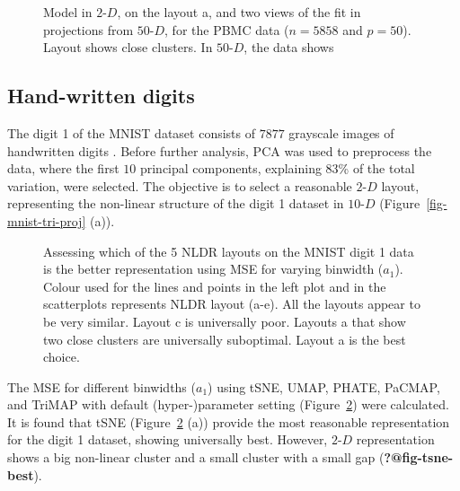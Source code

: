 \documentclass[
  12pt]{article}
\newcommand\gD{$2\text{-}D$}
\begin{document}
\begin{figure}[H]


\caption{\label{fig-model-pbmc-author-proj-scdeed}Model in \gD{}, on the
layout a, and two views of the fit in projections from \(50\text{-}D\),
for the PBMC data (\(n =  5858\) and \(p = 50\)). Layout shows close
clusters. In \(50\text{-}D\), the data shows}

\end{figure}%

\subsection{Hand-written digits}\label{hand-written-digits}

The digit 1 of the MNIST dataset consists of \(7877\) grayscale images
of handwritten digits \citep{lecun2010}. Before further analysis, PCA
was used to preprocess the data, where the first \(10\) principal
components, explaining 83\% of the total variation, were selected. The
objective is to select a reasonable \gD{} layout, representing the
non-linear structure of the digit 1 dataset in \(10\text{-}D\)
(Figure~\ref{fig-mnist-tri-proj} (a)).

\begin{figure}[H]


\caption{\label{fig-mnist-mse}Assessing which of the 5 NLDR layouts on
the MNIST digit 1 data is the better representation using MSE for
varying binwidth (\(a_1\)). Colour used for the lines and points in the
left plot and in the scatterplots represents NLDR layout (a-e). All the
layouts appear to be very similar. Layout c is universally poor. Layouts
a that show two close clusters are universally suboptimal. Layout a is
the best choice.}

\end{figure}%

The MSE for different binwidths (\(a_1\)) using tSNE, UMAP, PHATE,
PaCMAP, and TriMAP with default (hyper-)parameter setting
(Figure~\ref{fig-mnist-mse}) were calculated. It is found that tSNE
(Figure~\ref{fig-mnist-mse} (a)) provide the most reasonable
representation for the digit 1 dataset, showing universally best.
However, \gD{} representation shows a big non-linear cluster and a small
cluster with a small gap (\textbf{?@fig-tsne-best}).
\end{document}
